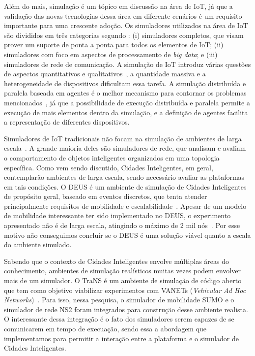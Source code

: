 Além do mais, simulação é um tópico em discussão na área de IoT, já que a validação das novas tecnologias dessa área em diferente cenários é um requisito importante para uma crescente adoção.
Os simuladores utilizados na área de IoT são divididos em três categorias segundo \cite{baig_2018}:
(i) simuladores completos, que visam prover um suporte de ponta a ponta para todos os elementos de IoT;
(ii) simuladores com foco em aspectos de processamento de \textit{big data};
e (iii) simuladores de rede de comunicação.
A simulação de IoT introduz várias questões de aspectos quantitativos e qualitativos~\cite{angelo_2016}, a quantidade massiva e a heterogeneidade de dispositivos dificultam essa tarefa.
A simulação distribuída e paralela baseada em agentes é o melhor mecanismo para contornar os problemas mencionados~\cite{angelo_2016}, já que a possibilidade de execução distribuída e paralela permite
a execução de mais elementos dentro da simulação, e a definição de agentes facilita a representação de diferentes dispositivos.

Simuladores de IoT tradicionais não focam na simulação de ambientes de larga escala~\cite{brambilla_2014}.
A grande maioria deles são simuladores de rede, que analisam e avaliam o comportamento de objetos inteligentes organizados em uma topologia específica.
Como vem sendo discutido, Cidades Inteligentes, em geral, contemplarão ambientes de larga escala, sendo necessário avaliar as plataformas em tais condições.
O DEUS é um ambiente de simulação de Cidades Inteligentes de propósito geral, baseado em eventos discretos, que tenta atender principalmente requisitos de mobilidade e escalabilidade~\cite{picone_2012}.
Apesar de um modelo de mobilidade interessante ter sido implementado no DEUS, o experimento apresentado não é de larga escala, atingindo o máximo de 2 mil nós~\cite{picone_2012}.
Por esse motivo não conseguimos concluir se o DEUS é uma solução viável quanto a escala do ambiente simulado.

Sabendo que o contexto de Cidades Inteligentes envolve múltiplas áreas do conhecimento, ambientes de simulação realísticos muitas vezes podem envolver mais de um simulador.
O TraNS é um ambiente de simulação de código aberto que tem como objetivo viabilizar experimentos com VANETs (\textit{Vehicular Ad Hoc Networks})~\cite{piorkowski_2008}.
Para isso, nessa pesquisa, o simulador de mobilidade SUMO e o simulador de rede NS2 foram integrados para construção desse ambiente realista.
O interessante dessa integração é o fato dos simuladores serem capazes de se comunicarem em tempo de execuação, sendo essa a abordagem que implementamos para permitir a interação entre a plataforma
e o simulador de Cidades Inteligentes.

